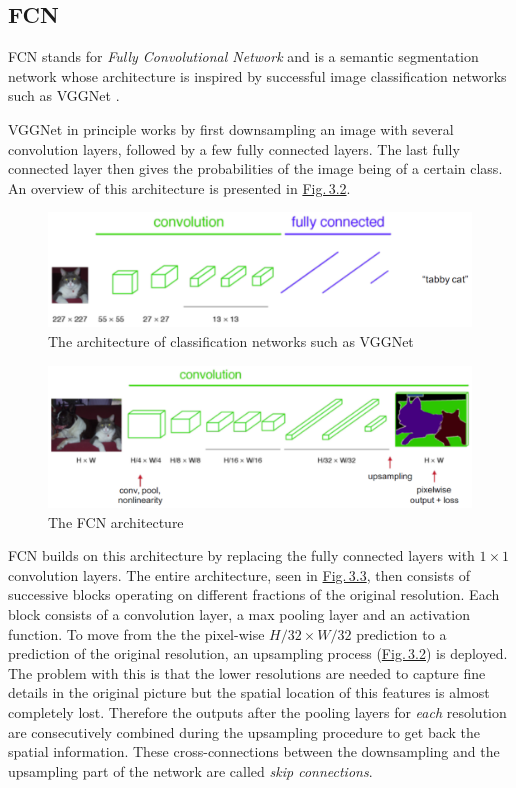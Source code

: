 \subsection{FCN} \label{sec:3.1.1}
FCN \cite{fcn} stands for \textit{Fully Convolutional Network} and is a semantic segmentation network whose architecture is inspired by successful image classification networks such as VGGNet \cite{vgg}. 

VGGNet in principle works by first downsampling an image with several convolution layers, followed by a few fully connected layers. The last fully connected layer then gives the probabilities of the image being of a certain class. An overview of this architecture is presented in \hyperref[fig:3.2]{Fig.\,3.2}.
%
\begin{figure} \label{fig:3.2}
    \centering
    \includegraphics[width=.65\textwidth]{Chapters/figures/vgg.PNG}
    \caption{The architecture of classification networks such as VGGNet}
\end{figure}
%
%
\begin{figure}[b] \label{fig:3.3}
    \centering
    \includegraphics[width=.65\textwidth]{Chapters/figures/fcn.PNG}
    \caption{The FCN architecture}
\end{figure}
%

FCN builds on this architecture by replacing the fully connected layers with $1\times1$ convolution layers. The entire architecture, seen in \hyperref[fig:3.3]{Fig.\,3.3}, then consists of successive blocks operating on different fractions of the original resolution. Each block consists of a convolution layer, a max pooling layer and an activation function. To move from the the pixel-wise $H/32\times W/32$ prediction to a prediction of the original resolution, an upsampling process (\hyperref[fig:3.4]{Fig.\,3.2}) is deployed. The problem with this is that the lower resolutions are needed to capture fine details in the original picture but the spatial location of this features is almost completely lost. Therefore the outputs after the pooling layers for \textit{each} resolution are consecutively combined during the upsampling procedure to get back the spatial information. These cross-connections between the downsampling and the upsampling part of the network are called \textit{skip connections}.

